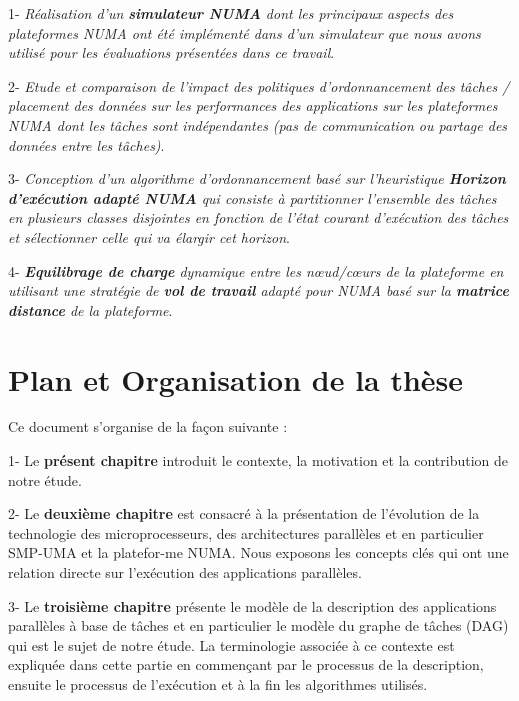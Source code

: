 \justify \hspace{\parindent}
1- \textit{Réalisation d'un \textbf{simulateur NUMA} dont les principaux aspects des plateformes NUMA ont été implémenté dans d’un simulateur que nous avons utilisé pour les évaluations présentées dans ce travail}.

\justify \hspace{\parindent}
2- \textit{Etude et comparaison de l'impact des politiques d'ordonnancement des tâches / placement des données sur les performances des applications sur les plateformes NUMA dont les tâches sont indépendantes (pas de communication ou partage des données entre les tâches)}.

\justify \hspace{\parindent}
3- \textit{Conception d'un algorithme d'ordonnancement basé sur l'heuristique \textbf{Horizon d'exécution adapté NUMA} qui consiste à partitionner l'ensemble des tâches en plusieurs classes disjointes en fonction de l'état courant d'exécution des tâches et sélectionner celle qui va élargir cet horizon}. 

\justify \hspace{\parindent}
4- \textit{\textbf{Equilibrage de charge} dynamique entre les nœud/cœurs de la plateforme en utilisant une stratégie de \textbf{vol de travail} adapté pour NUMA basé sur la \textbf{matrice distance} de la plateforme}. 

\section{Plan et Organisation de la thèse}
\justify \hspace{\parindent}
Ce document s’organise de la façon suivante : 

\justify \hspace{\parindent}
1- Le \textbf{présent chapitre} introduit le contexte, la motivation et la contribution de notre étude. 

\justify \hspace{\parindent}
2- Le \textbf{deuxième chapitre} est consacré à la présentation de l'évolution de la technologie des microprocesseurs, des architectures parallèles et en particulier SMP-UMA et la platefor-me NUMA. Nous exposons les concepts clés qui ont une relation directe sur l'exécution des applications parallèles.

\justify \hspace{\parindent}
3- Le \textbf{troisième chapitre} présente le modèle de la description des applications parallèles à base de tâches et en particulier le modèle du graphe de tâches (DAG) qui est le sujet de notre étude. La terminologie associée à ce contexte est expliquée dans cette partie en commençant par le processus de la description, ensuite le processus de l'exécution et à la fin les algorithmes utilisés.

